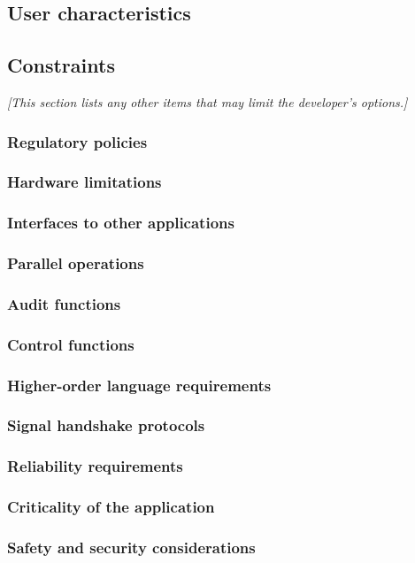 \documentclass{article}
\begin{document}
\subsection{User characteristics}

\subsection{Constraints}
\emph{[This section lists any other items that may limit the developer's
  options.]}

\subsubsection{Regulatory policies}
\subsubsection{Hardware limitations}
\subsubsection{Interfaces to other applications}
\subsubsection{Parallel operations}
\subsubsection{Audit functions}
\subsubsection{Control functions}
\subsubsection{Higher-order language requirements}
\subsubsection{Signal handshake protocols}
\subsubsection{Reliability requirements}
\subsubsection{Criticality of the application}
\subsubsection{Safety and security considerations}
\end{document}
